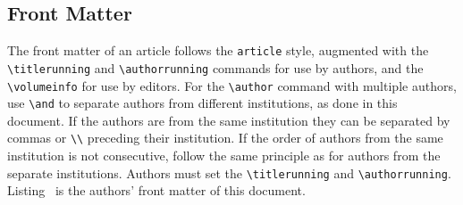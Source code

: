\documentclass{easychair}
\newcommand{\easychair}{\sf{easychair}}
\begin{document}
\subsection{Front Matter}
\label{sect:front-matter}

The front matter of an {\easychair} article follows the \texttt{article}
style, augmented with the \verb+\titlerunning+ and \verb+\authorrunning+
commands for use by authors, and the \verb+\volumeinfo+ for use by editors.
For the \verb+\author+ command with multiple authors, use \verb+\and+ to
separate authors from different institutions, as done in this document.
If the authors are from the same institution they can be separated
by commas or \verb+\\+ preceding their institution.
If the order of authors from the same institution is not consecutive, follow
the same principle as for authors from the separate institutions.
Authors must set the \verb+\titlerunning+ and \verb+\authorrunning+.
Listing~ is the authors' front matter of this 
document.

%
%
\end{document}
